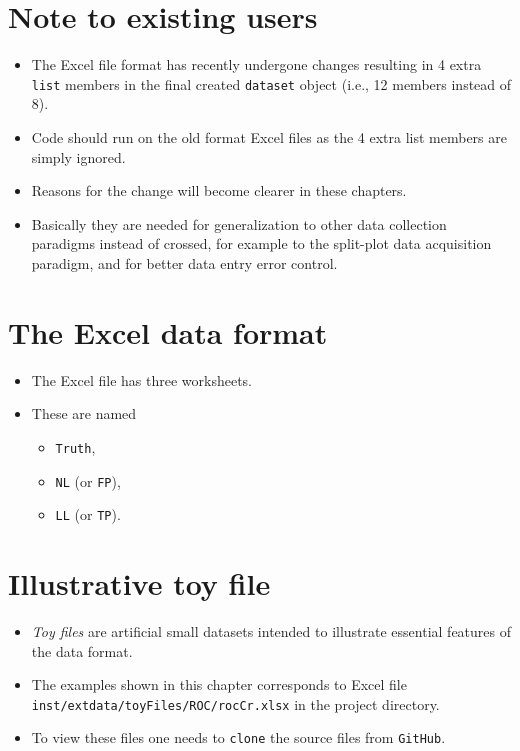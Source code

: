 \documentclass[
]{book}
\providecommand{\tightlist}{%
  \setlength{\itemsep}{0pt}\setlength{\parskip}{0pt}}
\begin{document}
\hypertarget{note-to-existing-users}{%
\section{Note to existing users}\label{note-to-existing-users}}

\begin{itemize}
\tightlist
\item
  The Excel file format has recently undergone changes resulting in 4 extra \texttt{list} members in the final created \texttt{dataset} object (i.e., 12 members instead of 8).
\item
  Code should run on the old format Excel files as the 4 extra list members are simply ignored.
\item
  Reasons for the change will become clearer in these chapters.
\item
  Basically they are needed for generalization to other data collection paradigms instead of crossed, for example to the split-plot data acquisition paradigm, and for better data entry error control.
\end{itemize}

\hypertarget{rocExceldataformat}{%
\section{The Excel data format}\label{rocExceldataformat}}

\begin{itemize}
\tightlist
\item
  The Excel file has three worksheets.
\item
  These are named

  \begin{itemize}
  \tightlist
  \item
    \texttt{Truth},
  \item
    \texttt{NL} (or \texttt{FP}),
  \item
    \texttt{LL} (or \texttt{TP}).
  \end{itemize}
\end{itemize}

\hypertarget{illustrative-toy-file}{%
\section{Illustrative toy file}\label{illustrative-toy-file}}

\begin{itemize}
\tightlist
\item
  \emph{Toy files} are artificial small datasets intended to illustrate essential features of the data format.\\
\item
  The examples shown in this chapter corresponds to Excel file \texttt{inst/extdata/toyFiles/ROC/rocCr.xlsx} in the project directory.
\item
  To view these files one needs to \texttt{clone} the source files from \texttt{GitHub}.
\end{itemize}
\end{document}
